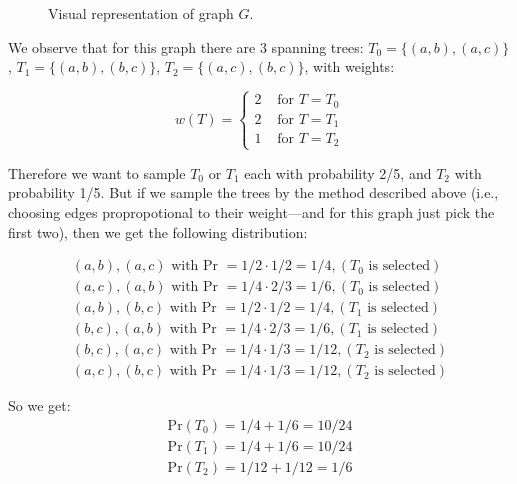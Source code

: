\documentclass[11pt]{article}
\begin{document}
\begin{figure}
\centering
{}
\caption{Visual representation of graph $G$.} \label{fig:graph1}
\end{figure}

We observe that for this graph there are 3 spanning trees:
$T_0 = \{(a,b), (a,c)\}$,
$T_1 = \{(a,b), (b,c)\}$,
$T_2 = \{(a,c), (b,c)\}$, with weights:

\[w(T) = \begin{cases}
        2 & \text{ for } T = T_0\\
        2 & \text{ for } T = T_1\\
        1 & \text{ for } T = T_2
        \end{cases}\]

Therefore we want to sample $T_0$ or $T_1$ each with probability 2/5, and $T_2$
with probability 1/5. But if we sample the trees by the method described above
(i.e., choosing edges propropotional to their weight---and for this graph just
pick the first two), then we get the following distribution:

\begin{align*}
(a,b), (a,c)\text{ with Pr }= 1/2 \cdot 1/2 = 1/4, (T_0 \text{ is selected})\\
(a,c), (a,b)\text{ with Pr }= 1/4 \cdot 2/3 = 1/6, (T_0 \text{ is selected})\\
(a,b), (b,c)\text{ with Pr }= 1/2 \cdot 1/2 = 1/4, (T_1 \text{ is selected})\\
(b,c), (a,b)\text{ with Pr }= 1/4 \cdot 2/3 = 1/6, (T_1 \text{ is selected})\\
(b,c), (a,c)\text{ with Pr }= 1/4 \cdot 1/3 = 1/12, (T_2 \text{ is selected})\\
(a,c), (b,c)\text{ with Pr }= 1/4 \cdot 1/3 = 1/12, (T_2 \text{ is selected})
\end{align*}

So we get:
\begin{align*}
\text{Pr}(T_0) = 1/4 + 1/6 = 10/24\\
\text{Pr}(T_1) = 1/4 + 1/6 = 10/24\\
\text{Pr}(T_2) = 1/12 + 1/12 = 1/6
\end{align*}
\end{document}
